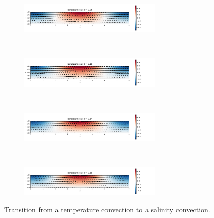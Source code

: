 \documentclass[10pt]{beamer}
\begin{document}
\begin{frame}
  \begin{figure}[ht]
    \centering
    \begin{subfigure}{\textwidth}
      \centering
      \includegraphics[width=0.75\textwidth]{images/TS_2.pdf}
    \end{subfigure}\\
    \begin{subfigure}{\textwidth}
      \centering
      \includegraphics[width=0.75\textwidth]{images/TS_3.pdf}
    \end{subfigure}\\
    \begin{subfigure}{\textwidth}
      \centering
      \includegraphics[width=0.75\textwidth]{images/TS_4.pdf}
    \end{subfigure}\\
    \begin{subfigure}{\textwidth}
      \centering
      \includegraphics[width=0.75\textwidth]{images/TS_5.pdf}
    \end{subfigure}
    \caption{Transition from a temperature convection to a salinity convection.}
    \label{fig:changeTS}
  \end{figure}

\end{frame}
\end{document}
